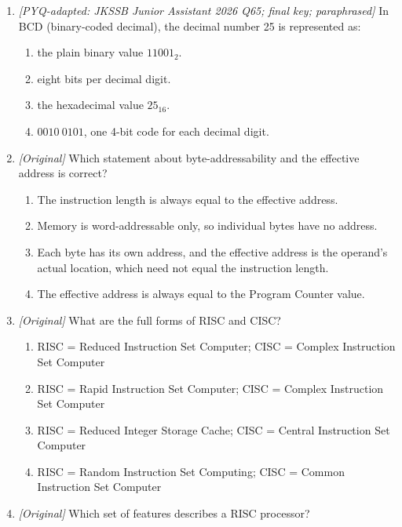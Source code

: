 \begin{enumerate}[label=\textbf{Q\arabic*.}, leftmargin=*]
\begin{enumerate}[label=\Alph*.]
      signed values.
    \item Both unsigned and signed values use zero-extension.
    \item Both unsigned and signed values use sign-extension.
  \end{enumerate}
\item \textit{[PYQ-adapted: JKSSB Junior Assistant 2026 Q65; final key;
paraphrased]} In BCD (binary-coded decimal), the decimal number 25 is
represented as:
  \begin{enumerate}[label=\Alph*.]
    \item the plain binary value $11001_2$.
    \item eight bits per decimal digit.
    \item the hexadecimal value $25_{16}$.
    \item $0010\ 0101$, one 4-bit code for each decimal digit.
  \end{enumerate}
\item \textit{[Original]} Which statement about byte-addressability and the
effective address is correct?
  \begin{enumerate}[label=\Alph*.]
    \item The instruction length is always equal to the effective address.
    \item Memory is word-addressable only, so individual bytes have no
      address.
    \item Each byte has its own address, and the effective address is the
      operand's actual location, which need not equal the instruction
      length.
    \item The effective address is always equal to the Program Counter value.
  \end{enumerate}
\item \textit{[Original]} What are the full forms of RISC and CISC?
  \begin{enumerate}[label=\Alph*.]
    \item RISC = Reduced Instruction Set Computer; CISC = Complex
      Instruction Set Computer
    \item RISC = Rapid Instruction Set Computer; CISC = Complex Instruction
      Set Computer
    \item RISC = Reduced Integer Storage Cache; CISC = Central Instruction
      Set Computer
    \item RISC = Random Instruction Set Computing; CISC = Common Instruction
      Set Computer
  \end{enumerate}
\item \textit{[Original]} Which set of features describes a RISC processor?

\end{enumerate}
